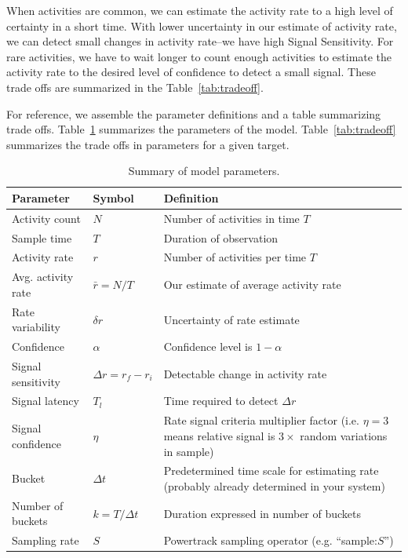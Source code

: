 \documentclass{article}
\begin{document}
When activities are common, we can estimate the activity rate to a high level of certainty in a short time. With lower
uncertainty in our estimate of activity rate, we can detect small changes in activity rate--we have high Signal
Sensitivity. For rare activities, we have to wait longer to count enough activities to estimate the activity rate to
the desired level of confidence to detect a small signal. These trade offs are summarized in the Table~\ref{tab:tradeoff}.

For reference, we assemble the parameter definitions and a table summarizing trade offs.  Table~\ref{tab:summary}
summarizes the parameters of the model. Table~\ref{tab:tradeoff} summarizes the trade offs in parameters for
a given target.

\begin{table} [!h]
    \begin{tabular}{p{3.0cm}| p{1.9cm}|p{5.9cm}}
     \hline
Parameter  & Symbol & Definition \\
\hline	
Activity count & $N$ & Number of activities in time $T$\\
Sample time & $T$	& Duration of observation\\
Activity rate & $r$	& Number of activities per time $T$\\
Avg. activity rate & $\bar{r} = N/T$ & Our estimate of average activity rate \\
Rate variability & $\delta r$	& Uncertainty of rate estimate \\
Confidence & $\alpha$ & Confidence level is $1-\alpha$\\
Signal sensitivity & $\Delta r=r_{f}-r_{i}$ & Detectable change in activity rate \\
Signal latency & $T_l$ & Time required to detect $\Delta r$  \\
Signal confidence & $\eta$ & Rate signal criteria multiplier factor (i.e. $\eta = 3$ means relative signal is $3 \times$ random variations in sample) \\
Bucket & $\Delta t$ & Predetermined time scale for estimating rate (probably already determined in your system)\\
Number of buckets & $k=T/\Delta t$ & Duration expressed in number of  buckets \\
Sampling rate & $S$	& Powertrack sampling operator (e.g. ``sample:$S$'') \\
\hline
\end{tabular}
\caption{Summary of model parameters.}
\label{tab:summary}
\end{table}
\end{document}
